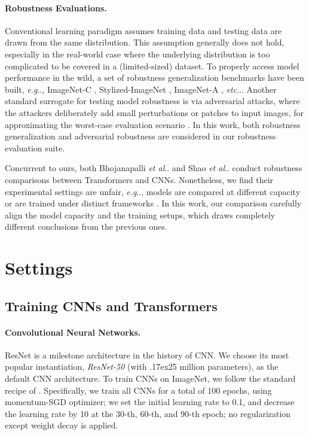 \documentclass{article}
\makeatletter
\def\vs{{\bm{s}}}
\newcommand{\app}{\raise.17ex\hbox{}}
\DeclareRobustCommand\onedot{\futurelet\@let@token\@onedot}
\def\@onedot{\ifx\@let@token.\else.\null\fi\xspace}
\def\eg{\emph{e.g}\onedot} \def\Eg{\emph{E.g}\onedot}
\def\etc{\emph{etc}\onedot} \def\vs{\emph{vs}\onedot}
\def\etal{\emph{et al}\onedot}
\makeatother
\begin{document}
\paragraph{Robustness Evaluations.}
Conventional learning paradigm assumes training data and testing data are drawn from the same distribution. This assumption generally does not hold, especially in the real-world case where the underlying distribution is too complicated to be covered in a (limited-sized) dataset. To properly access model performance in the wild, a set of robustness generalization benchmarks have been built, \eg, ImageNet-C \cite{Hendrycks2018},  Stylized-ImageNet \cite{Geirhos2018}, ImageNet-A \cite{hendrycks2021nae}, \etc. Another standard surrogate for testing model robustness is via adversarial attacks, where the attackers deliberately add small perturbations or patches to input images, for approximating the worst-case evaluation scenario \cite{Szegedy2014,Goodfellow2015}. In this work, both robustness generalization and adversarial robustness are considered in our robustness evaluation suite.

Concurrent to ours, both Bhojanapalli \etal \cite{bhojanapalli2021understanding} and Shao \etal \cite{shao2021adversarial} conduct robustness comparisons between Transformers and CNNs. Nonetheless, we find their experimental settings are unfair, \eg, models are compared at different capacity \cite{bhojanapalli2021understanding,shao2021adversarial} or are trained under distinct frameworks \cite{shao2021adversarial}. In this work, our comparison carefully align the model capacity and the training setups, which draws completely different conclusions from the previous ones.



\section{Settings}
\label{Sec:settings}
\subsection{Training CNNs and Transformers}
\label{sec:settings:vit}
\paragraph{Convolutional Neural Networks.}
ResNet \cite{He2016} is a milestone architecture in the history of CNN. We choose its most popular instantiation, \emph{ResNet-50} (with \app25 million parameters), as the default CNN architecture. To train CNNs on ImageNet, we follow the standard recipe of \cite{goyal2017accurate,radosavovic2020designing}. Specifically, we train all CNNs for a total of 100 epochs, using momentum-SGD optimizer; we set the initial learning rate to 0.1, and decrease the learning rate by 10 at the 30-th, 60-th, and 90-th epoch; no regularization except weight decay is applied.
\end{document}
